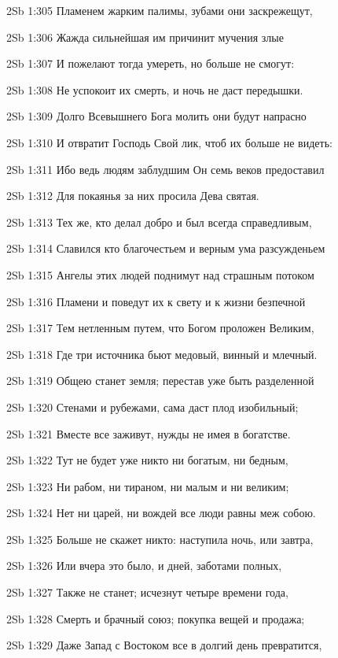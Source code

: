 \vs 2Sb 1:305 Пламенем жарким палимы, зубами они заскрежещут, 

\vs 2Sb 1:306 Жажда сильнейшая им причинит мучения злые 

\vs 2Sb 1:307 И пожелают тогда умереть, но больше не смогут: 

\vs 2Sb 1:308 Не успокоит их смерть, и ночь не даст передышки. 

\vs 2Sb 1:309 Долго Всевышнего Бога молить они будут напрасно 

\vs 2Sb 1:310 И отвратит Господь Свой лик, чтоб их больше не видеть: 

\vs 2Sb 1:311 Ибо ведь людям заблудшим Он семь веков предоставил 

\vs 2Sb 1:312 Для покаянья  за них просила Дева святая. 

\vs 2Sb 1:313 Тех же, кто делал добро и был всегда справедливым, 

\vs 2Sb 1:314 Славился кто благочестьем и верным ума разсужденьем 

\vs 2Sb 1:315 Ангелы этих людей поднимут над страшным потоком 

\vs 2Sb 1:316 Пламени и поведут их к свету и к жизни безпечной 

\vs 2Sb 1:317 Тем нетленным путем, что Богом проложен Великим, 

\vs 2Sb 1:318 Где три источника бьют  медовый, винный и млечный. 

\vs 2Sb 1:319 Общею станет земля; перестав уже быть разделенной

\vs 2Sb 1:320 Стенами и рубежами, сама даст плод изобильный; 

\vs 2Sb 1:321 Вместе все заживут, нужды не имея в богатстве. 

\vs 2Sb 1:322 Тут не будет уже никто ни богатым, ни бедным, 

\vs 2Sb 1:323 Ни рабом, ни тираном, ни малым и ни великим; 

\vs 2Sb 1:324 Нет ни царей, ни вождей  все люди равны меж собою.

\vs 2Sb 1:325 Больше не скажет никто: наступила ночь, или завтра, 

\vs 2Sb 1:326 Или вчера это было, и дней, заботами полных, 

\vs 2Sb 1:327 Также не станет; исчезнут четыре времени года,

\vs 2Sb 1:328 Смерть и брачный союз; покупка вещей и продажа; 

\vs 2Sb 1:329 Даже Запад с Востоком  все в долгий день превратится,

